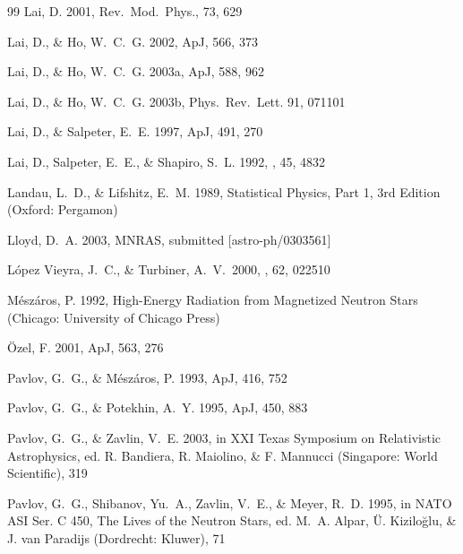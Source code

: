 \documentclass{emulateapj}
\begin{document}
\begin{thebibliography}{99}
Lai, D. 2001,
Rev.\ Mod.\ Phys., 73, 629

Lai, D., \& Ho, W.~C.~G. 2002,
ApJ, 566, 373

Lai, D., \& Ho, W.~C.~G. 2003a,
ApJ, 588, 962

Lai, D., \& Ho, W.~C.~G. 2003b,
Phys.\ Rev.\ Lett. 91, 071101

Lai, D., \& Salpeter, E.~E. 1997, ApJ, 491, 270

Lai, D., Salpeter, E.~E., \& Shapiro, S.~L. 1992, \pra, 45, 4832 

Landau, L.~D., \& Lifshitz, E.~M. 1989,
Statistical Physics, Part 1, 3rd Edition
(Oxford: Pergamon)

Lloyd, D.~A. 2003, MNRAS, submitted [astro-ph/0303561]

L{\'o}pez Vieyra, J.~C., \& Turbiner, A.~V.\ 2000, \pra, 62, 022510 


M\'esz\'aros, P. 1992,
High-Energy Radiation from Magnetized Neutron Stars
(Chicago: University of Chicago Press)

{\"O}zel, F. 2001,
ApJ, 563, 276

Pavlov, G.~G., \& M\'esz\'aros, P. 1993,
ApJ, 416, 752

Pavlov, G.~G., \& Potekhin, A.~Y. 1995,
ApJ, 450, 883

Pavlov, G.~G., \& Zavlin, V.~E. 2003,
in XXI Texas Symposium on Relativistic Astrophysics,
ed. R. Bandiera, R. Maiolino, \& F. Mannucci
(Singapore: World Scientific), 319

Pavlov, G.~G., Shibanov, Yu.~A., Zavlin, V.~E., \& Meyer, R.~D. 1995,
in NATO ASI Ser. C 450,
The Lives of the Neutron Stars,
ed. M.~A. Alpar, \"U. Kizilo\u{g}lu, \& J. van Paradijs
(Dordrecht: Kluwer), 71


\end{thebibliography}
\end{document}
